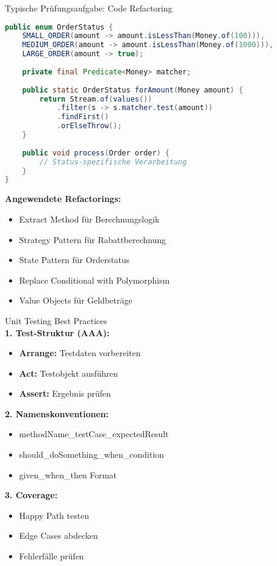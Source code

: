 \begin{example2}{Typische Prüfungsaufgabe: Code Refactoring}
\begin{lstlisting}[language=Java, style=base]
public enum OrderStatus {
    SMALL_ORDER(amount -> amount.isLessThan(Money.of(100))),
    MEDIUM_ORDER(amount -> amount.isLessThan(Money.of(1000))),
    LARGE_ORDER(amount -> true);
    
    private final Predicate<Money> matcher;
    
    public static OrderStatus forAmount(Money amount) {
        return Stream.of(values())
            .filter(s -> s.matcher.test(amount))
            .findFirst()
            .orElseThrow();
    }
    
    public void process(Order order) {
        // Status-spezifische Verarbeitung
    }
}
\end{lstlisting}

\textbf{Angewendete Refactorings:}
\begin{itemize}
    \item Extract Method für Berechnungslogik
    \item Strategy Pattern für Rabattberechnung
    \item State Pattern für Orderstatus
    \item Replace Conditional with Polymorphism
    \item Value Objects für Geldbeträge
\end{itemize}
\end{example2}

\begin{KR}{Unit Testing Best Practices}\\
\textbf{1. Test-Struktur (AAA):}
\begin{itemize}
    \item \textbf{Arrange:} Testdaten vorbereiten
    \item \textbf{Act:} Testobjekt ausführen
    \item \textbf{Assert:} Ergebnis prüfen
\end{itemize}

\textbf{2. Namenskonventionen:}
\begin{itemize}
    \item methodName_testCase_expectedResult
    \item should_doSomething_when_condition
    \item given_when_then Format
\end{itemize}

\textbf{3. Coverage:}
\begin{itemize}
    \item Happy Path testen
    \item Edge Cases abdecken
    \item Fehlerfälle prüfen
\end{itemize}
\end{KR}

